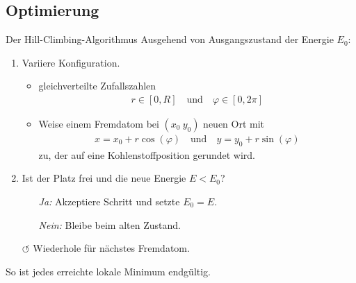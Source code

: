 \documentclass{beamer}
\def \phi {\varphi}
\begin{document}
	\subsection{Optimierung}

	\begin{frame}{Der Hill-Climbing-Algorithmus}
		Ausgehend von Ausgangszustand der Energie $E_0$:
		\begin{enumerate}
			\item Variiere Konfiguration.
			\begin{itemize}
				\item gleichverteilte Zufallszahlen
				\begin{align*}
					r \in [0, R] \quad \text{und} \quad \phi \in [0, 2 \pi]
				\end{align*}
				\item Weise einem Fremdatom bei $(x_0 \ y_0)$ neuen Ort mit
				\begin{align*}
					x = x_0 + r \cos(\phi) \quad \text{und} \quad y = y_0 + r \sin(\phi)
				\end{align*}
				zu, der auf eine Kohlenstoffposition gerundet wird.
			\end{itemize}
			\item Ist der Platz frei und die neue Energie $E < E_0$?
			\begin{itemize}
				\item[\emph{Ja:}] Akzeptiere Schritt und setzte $E_0 = E$.
				\item[\emph{Nein:}] Bleibe beim alten Zustand.
			\end{itemize}
			\item[$\circlearrowleft$] Wiederhole für nächstes Fremdatom.
		\end{enumerate}
		So ist jedes erreichte lokale Minimum endgültig.
	\end{frame}
	
\end{document}
